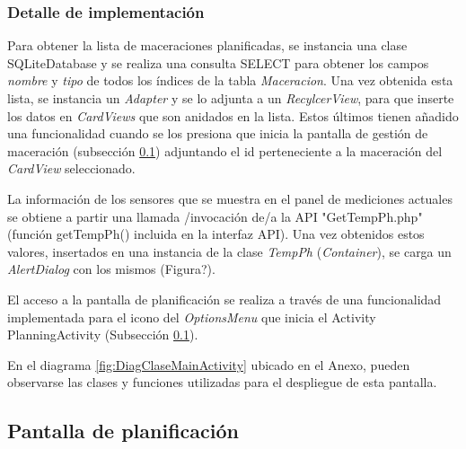             \subsubsection{Detalle de implementación}
                
                Para obtener la lista de maceraciones planificadas, se instancia una clase SQLiteDatabase y se realiza una consulta SELECT para obtener los campos \textit{nombre} y \textit{tipo} de todos los índices de la tabla \textit{Maceracion}. Una vez obtenida esta lista, se instancia un \textit{Adapter} y se lo adjunta a un \textit{RecylcerView}, para que inserte los datos en \textit{CardViews} que son anidados en la lista. Estos últimos tienen añadido una funcionalidad cuando se los presiona que inicia la pantalla de gestión de maceración (subsección \ref{DescripPantallaPlanificación}) adjuntando el id perteneciente a la maceración del \textit{CardView} seleccionado.
                
                \par La información de los sensores que se muestra en el panel de mediciones actuales se obtiene a partir una llamada /invocación de/a la API "GetTempPh.php" (función getTempPh() incluida en la interfaz API). Una vez obtenidos estos valores, insertados en una instancia de la clase \textit{TempPh} (\textit{Container}), se carga un \textit{AlertDialog} con los mismos (Figura?).
                
                \par El acceso a la pantalla de planificación se realiza a través de una funcionalidad implementada para el icono del \textit{OptionsMenu} que inicia el Activity PlanningActivity (Subsección \ref{DescripPantallaPlanificación}).
                
                \par En el diagrama \ref{fig:DiagClaseMainActivity} ubicado en el Anexo, pueden observarse las clases y funciones utilizadas para el despliegue de esta pantalla.
                
                
                
        \subsection{Pantalla de planificación}
        \label{DescripPantallaPlanificación}
